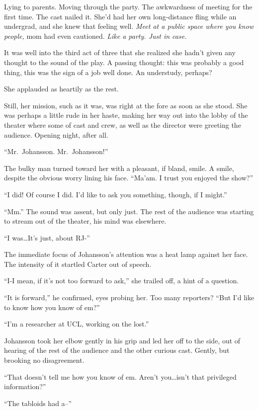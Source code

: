 Lying to parents. Moving through the party. The awkwardness of meeting for the first time. The cast nailed it. She'd had her own long-distance fling while an undergrad, and she knew that feeling well. \emph{Meet at a public space where you know people,} mom had even cautioned. \emph{Like a party. Just in case.}

It was well into the third act of three that she realized she hadn't given any thought to the sound of the play. A passing thought: this was probably a good thing, this was the sign of a job well done. An understudy, perhaps?

She applauded as heartily as the rest.

Still, her mission, such as it was, was right at the fore as soon as she stood. She was perhaps a little rude in her haste, making her way out into the lobby of the theater where some of cast and crew, as well as the director were greeting the audience. Opening night, after all.

``Mr.~Johansson. Mr.~Johansson!''

The bulky man turned toward her with a pleasant, if bland, smile. A smile, despite the obvious worry lining his face. ``Ma'am. I trust you enjoyed the show?''

``I did! Of course I did. I'd like to ask you something, though, if I might.''

``Mm.'' The sound was assent, but only just. The rest of the audience was starting to stream out of the theater, his mind was elsewhere.

``I was\ldots{}It's just, about RJ-''

The immediate focus of Johansson's attention was a heat lamp against her face. The intensity of it startled Carter out of speech.

``I-I mean, if it's not too forward to ask,'' she trailed off, a hint of a question.

``It is forward,'' he confirmed, eyes probing her. Too many reporters? ``But I'd like to know how you know of em?''

``I'm a researcher at UCL, working on the lost.''

Johansson took her elbow gently in his grip and led her off to the side, out of hearing of the rest of the audience and the other curious cast. Gently, but brooking no disagreement.

``That doesn't tell me how you know of em. Aren't you\ldots{}isn't that privileged information?''

``The tabloids had a--''


